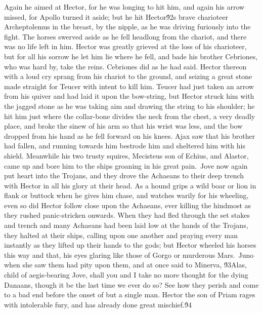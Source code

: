 {Again he aimed at Hector, for he was longing to hit him, and again his arrow missed, for Apollo turned it aside; but he hit Hector\'92s brave charioteer Archeptolemus in the breast, by the nipple, as he was driving furiously into the fight. The horses swerved aside as he fell headlong from the chariot, and there was no life left in him. Hector was greatly grieved at the loss of his charioteer, but for all his sorrow he let him lie where he fell, and bade his brother Cebriones, who was hard by, take the reins. Cebriones did as he had said. Hector thereon with a loud cry sprang from his chariot to the ground, and seizing a great stone made straight for Teucer with intent to kill him. Teucer had just taken an arrow from his quiver and had laid it upon the bow-string, but Hector struck him with the jagged stone as he was taking aim and drawing the string to his shoulder; he hit him just where the collar-bone divides the neck from the chest, a very deadly place, and broke the sinew of his arm so that his wrist was less, and the bow dropped from his hand as he fell forward on his knees. Ajax saw that his brother had fallen, and running towards him bestrode him and sheltered him with his shield. Meanwhile his two trusty squires, Mecisteus son of Echius, and Alastor, came up and bore him to the ships groaning in his great pain.\
Jove now again put heart into the Trojans, and they drove the Achaeans to their deep trench with Hector in all his glory at their head. As a hound grips a wild boar or lion in flank or buttock when he gives him chase, and watches warily for his wheeling, even so did Hector follow close upon the Achaeans, ever killing the hindmost as they rushed panic-stricken onwards. When they had fled through the set stakes and trench and many Achaeans had been laid low at the hands of the Trojans, they halted at their ships, calling upon one another and praying every man instantly as they lifted up their hands to the gods; but Hector wheeled his horses this way and that, his eyes glaring like those of Gorgo or murderous Mars.\
Juno when she saw them had pity upon them, and at once said to Minerva, \'93Alas, child of aegis-bearing Jove, shall you and I take no more thought for the dying Danaans, though it be the last time we ever do so? See how they perish and come to a bad end before the onset of but a single man. Hector the son of Priam rages with intolerable fury, and has already done great mischief.\'94\
}
